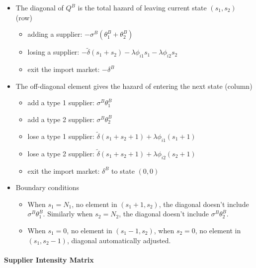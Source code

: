 \documentclass[12pt]{article} \usepackage{amsmath,amssymb,amsthm,geometry,graphicx,setspace,algorithm,algpseudocode,float}
\newcommand{\subsubsubsection}[1]{\paragraph{#1}}
\begin{document}
\begin{itemize}
    \item  The diagonal of $Q^B$ is the total hazard of leaving current state $(s_1, s_2)$ (row)
    \begin{itemize}
        \item adding a supplier: $-\sigma^B(\theta_1^B + \theta_2^B)$
        \item losing a supplier: $-\tilde{\delta}(s_1+s_2)-\lambda\phi_{i1}s_1-\lambda\phi_{i2}s_2$
        \item exit the import market: $-\delta^B$ 
    \end{itemize}
    \item The off-diagonal element gives the hazard of entering the next state (column)
    \begin{itemize}
        \item add a type 1 supplier: $\sigma^B\theta_1^B$
        \item add a type 2 supplier: $\sigma^B\theta_2^B$
        \item lose a type 1 supplier: $\tilde{\delta}(s_1+s_2+1) + \lambda\phi_{i1}(s_1+1)$
        \item lose a type 2 supplier: $\tilde{\delta}(s_1+s_2+1)+ \lambda\phi_{i2}(s_2+1)$
        \item exit the import market: $\delta^B$ to state $(0,0)$
    \end{itemize}
    \item Boundary conditions 
    \begin{itemize}
        \item When $s_1 = N_1$, no element in $(s_1+1,s_2)$, the diagonal doesn't include $\sigma^B\theta_1^B$. Similarly when $s_2 = N_2$, the diagonal doesn't include $\sigma^B\theta_2^B$.
        \item When $s_1 = 0$, no element in $(s_1-1,s_2)$, when $s_2 = 0$, no element in $(s_1,s_2-1)$, diagonal automatically adjusted.
    \end{itemize}
\end{itemize}
    

\subsubsubsection{Supplier Intensity Matrix}
\end{document}
